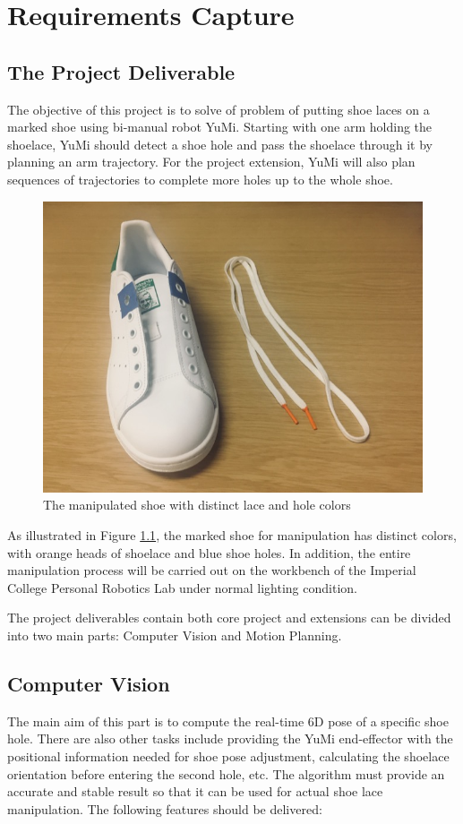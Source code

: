 \chapter{Requirements Capture}

\section{The Project Deliverable}
The objective of this project is to solve of problem of putting shoe laces on a marked shoe using bi-manual robot YuMi. Starting with one arm holding the shoelace, YuMi should detect a shoe hole and pass the shoelace through it by planning an arm trajectory. For the project extension, YuMi will also plan sequences of trajectories to complete more holes up to the whole shoe.

\begin{figure}[H]
\centering
\includegraphics[width = 0.5\columnwidth]{RequirementsCap/shoe.jpg}
\caption{The manipulated shoe with distinct lace and hole colors}
\label{shoe}
\end{figure}

As illustrated in Figure \ref{shoe}, the marked shoe for manipulation has distinct colors, with orange heads of shoelace and blue shoe holes. In addition, the entire manipulation process will be carried out on the workbench of the Imperial College Personal Robotics Lab under normal lighting condition.

The project deliverables contain both core project and extensions can be divided into two main parts: Computer Vision and Motion Planning.

\section{Computer Vision}
The main aim of this part is to compute the real-time 6D pose of a specific shoe hole. There are also other tasks include providing the YuMi end-effector with the positional information needed for shoe pose adjustment, calculating the shoelace orientation before entering the second hole, etc. The algorithm must provide an accurate and stable result so that it can be used for actual shoe lace manipulation. The following features should be delivered:

